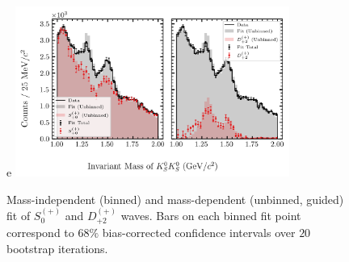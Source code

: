 \begin{figure}
  \begin{center}                                                                                                                                                                                                                                                                                                                                                                                                                                                                                                                                                                                                                                                                                                                                                                                                                                                                                     e
    \includegraphics[width=0.8\textwidth]{figures/binned_and_unbinned_fit_chisqdof_3.4_splot_D_1s_2b_guided_phase_factor_waves491_uncertainty_bootstrap-SE.png}
  \end{center}
  \caption{Mass-independent (binned) and mass-dependent (unbinned, guided) fit of $S_{0}^{(+)}$ and $D_{+2}^{(+)}$ waves. Bars on each binned fit point correspond to $68\%$ bias-corrected confidence intervals over $20$ bootstrap iterations.}\label{fig:unbinned-guided-fit-chisqdof-3.4-Sp-D2p}
\end{figure}

